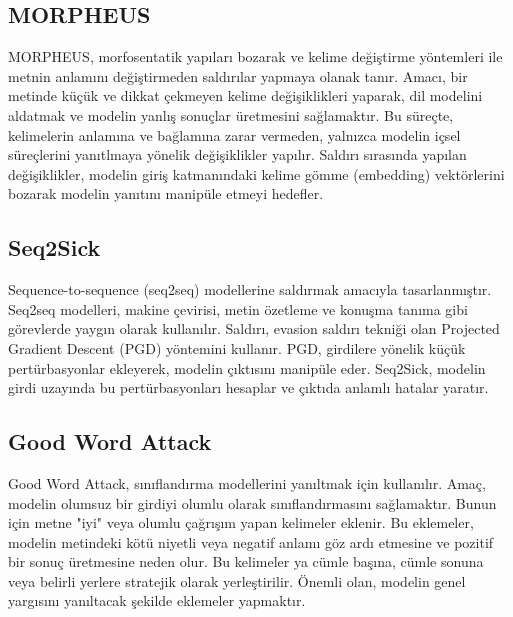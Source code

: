 \newpage

\subsection{MORPHEUS}

MORPHEUS, morfosentatik yapıları bozarak ve kelime değiştirme yöntemleri ile metnin anlamını değiştirmeden saldırılar yapmaya olanak tanır. Amacı, bir metinde küçük ve dikkat çekmeyen kelime değişiklikleri yaparak, dil modelini aldatmak ve modelin yanlış sonuçlar üretmesini sağlamaktır. Bu süreçte, kelimelerin anlamına ve bağlamına zarar vermeden, yalnızca modelin içsel süreçlerini yanıtlmaya yönelik değişiklikler yapılır. Saldırı sırasında yapılan değişiklikler, modelin giriş katmanındaki kelime gömme (embedding) vektörlerini bozarak modelin yanıtını manipüle etmeyi hedefler.

\newpage

\subsection{Seq2Sick}

Sequence-to-sequence (seq2seq) modellerine saldırmak amacıyla tasarlanmıştır. Seq2seq modelleri, makine çevirisi, metin özetleme ve konuşma tanıma gibi görevlerde yaygın olarak kullanılır. Saldırı, evasion saldırı tekniği olan Projected Gradient Descent (PGD) yöntemini kullanır. PGD, girdilere yönelik küçük pertürbasyonlar ekleyerek, modelin çıktısını manipüle eder. Seq2Sick, modelin girdi uzayında bu pertürbasyonları hesaplar ve çıktıda anlamlı hatalar yaratır. 

\newpage

\subsection{Good Word Attack}

Good Word Attack, sınıflandırma modellerini yanıltmak için kullanılır. Amaç, modelin olumsuz bir girdiyi olumlu olarak sınıflandırmasını sağlamaktır. Bunun için metne "iyi" veya olumlu çağrışım yapan kelimeler eklenir. Bu eklemeler, modelin metindeki kötü niyetli veya negatif anlamı göz ardı etmesine ve pozitif bir sonuç üretmesine neden olur. Bu kelimeler ya cümle başına, cümle sonuna veya belirli yerlere stratejik olarak yerleştirilir. Önemli olan, modelin genel yargısını yanıltacak şekilde eklemeler yapmaktır.

\newpage